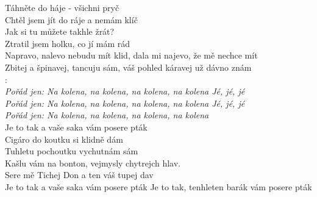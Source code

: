 
Táhněte do háje - všichni pryč\\
Chtěl jsem jít do ráje a nemám klíč\\
Jak si tu můžete takhle žrát?\\
Ztratil jsem holku, co jí mám rád\\
 
Napravo, nalevo nebudu mít klid, dala mi najevo, že mě nechce mít\\
Zbitej a špinavej, tancuju sám, váš pohled káravej už dávno znám\\
 
\textregistered:\\
\emph{Pořád jen: Na kolena, na kolena, na kolena, na kolena Jé, jé, jé\\
Pořád jen: Na kolena, na kolena, na kolena, na kolena Jé, jé, jé\\
Pořád jen: Na kolena, na kolena, na kolena, na kolena}\\
Je to tak a vaše saka vám posere pták\\
 
Cigáro do koutku si klidně dám\\
Tuhletu pochoutku vychutnám sám\\
Kašlu vám na bonton, vejmysly chytrejch hlav.\\
Sere mě Tichej Don a ten váš tupej dav\\
 
\textregistered Je to tak a vaše saka vám posere pták
\textregistered Je to tak, tenhleten barák vám posere pták 

\newpage
